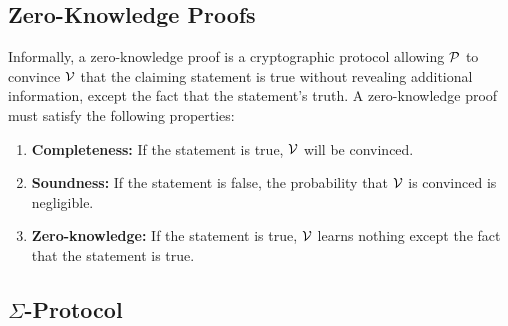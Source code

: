 \subsection{Zero-Knowledge Proofs}
Informally, a zero-knowledge proof is a cryptographic protocol allowing $\mathcal{P}$ to convince $\mathcal{V}$ that the claiming statement is true without revealing additional information, except the fact that the statement's truth. A zero-knowledge proof must satisfy the following properties:
\begin{enumerate}
    \item \textbf{Completeness:} If the statement is true, $\mathcal{V}$ will be convinced.
    \item \textbf{Soundness:} If the statement is false, the probability that $\mathcal{V}$ is convinced is negligible.
    \item \textbf{Zero-knowledge:} If the statement is true, $\mathcal{V}$ learns nothing except the fact that the statement is true.
\end{enumerate}

\subsection{$\Sigma$-Protocol}

